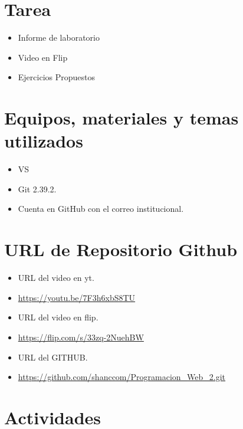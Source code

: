 \documentclass{article}
\begin{document}
	\section{Tarea}
	\begin{itemize}		
		\item Informe de laboratorio
            \item Video en Flip
		\item Ejercicios Propuestos
        
	\end{itemize}
		
	\section{Equipos, materiales y temas utilizados}
	\begin{itemize}
		\item VS
		\item Git 2.39.2.
		\item Cuenta en GitHub con el correo institucional.
	\end{itemize}
    \clearpage
    
	\section{URL de Repositorio Github}
	\begin{itemize}
        \item URL del video en yt.
		\item \url{https://youtu.be/7F3h6xbS8TU}
        \item URL del video en flip.
		\item \url{https://flip.com/s/33zq-2NuehBW}
        \item URL del GITHUB.
            \item \url{https://github.com/shanccom/Programacion_Web_2.git}
	\end{itemize}
	
	\section{Actividades}
\end{document}
